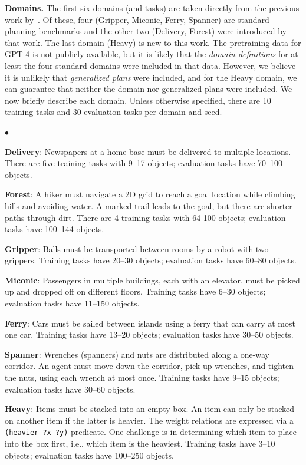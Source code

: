 \documentclass[letterpaper]{article} %
\newenvironment{tightlist}%
{\begin{list}{$\bullet$}{%
    \setlength{\topsep}{0in}
    \setlength{\partopsep}{0in}
    \setlength{\itemsep}{0in}
    \setlength{\parsep}{0in}
    \setlength{\leftmargin}{1.5em}
    \setlength{\rightmargin}{0in}
}
}%
{\end{list}
}
\begin{document}
\textbf{Domains.}
The first six domains (and tasks) are taken directly from the previous work by~\citet{yang2022pg3}.
Of these, four (Gripper, Miconic, Ferry, Spanner) are standard planning benchmarks and the other two (Delivery, Forest) were introduced by that work.
The last domain (Heavy) is new to this work.
The pretraining data for GPT-4 is not publicly available, but it is likely that the \emph{domain definitions} for at least the four standard domains were included in that data.
However, we believe it is unlikely that \emph{generalized plans} were included, and for the Heavy domain, we can guarantee that neither the domain nor generalized plans were included.
We now briefly describe each domain.
Unless otherwise specified, there are 10 training tasks and 30 evaluation tasks per domain and seed.
\vspace{2pt}
\begin{tightlist}
\item \textbf{Delivery}: Newspapers at a home base must be delivered to multiple locations. There are five training tasks with 9--17 objects; evaluation tasks have 70--100 objects.
\item \textbf{Forest}: A hiker must navigate a 2D grid to reach a goal location while climbing hills and avoiding water. A marked trail leads to the goal, but there are shorter paths through dirt. There are 4 training tasks with 64-100 objects; evaluation tasks have 100--144 objects.
\item \textbf{Gripper}: Balls must be transported between rooms by a robot with two grippers. Training tasks have 20--30 objects; evaluation tasks have 60--80 objects.
\item \textbf{Miconic}: Passengers in multiple buildings, each with an elevator, must be picked up and dropped off on different floors. Training tasks have 6--30 objects; evaluation tasks have 11--150 objects.
\item \textbf{Ferry}: Cars must be sailed between islands using a ferry that can carry at most one car.
Training tasks have 13--20 objects; evaluation tasks have 30--50 objects.
\item \textbf{Spanner}: Wrenches (spanners) and nuts are distributed along a one-way corridor. An agent must move down the corridor, pick up wrenches, and tighten the nuts, using each wrench at most once.
Training tasks have 9--15 objects; evaluation tasks have 30--60 objects.
\item \textbf{Heavy}: Items must be stacked into an empty box. An item can only be stacked on another item if the latter is heavier. The weight relations are expressed via a \texttt{(heavier ?x ?y)} predicate. One challenge is in determining which item to place into the box first, i.e., which item is the heaviest.
Training tasks have 3--10 objects; evaluation tasks have 100--250 objects.
\end{tightlist}
\vspace{2pt}
\end{document}
